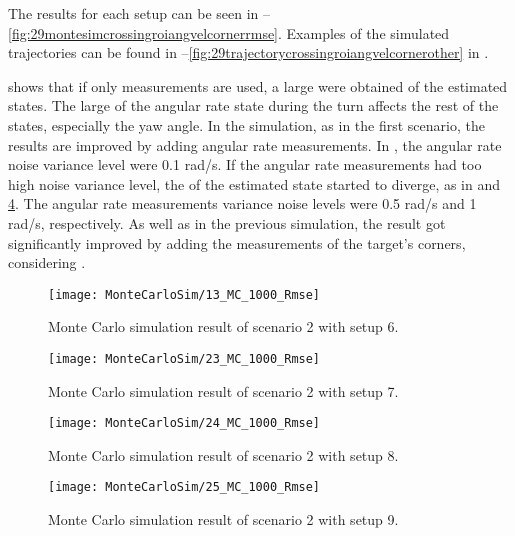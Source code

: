 The results for each setup can be seen in --\ref{fig:29montesimcrossingroiangvelcornerrmse}.
Examples of the simulated trajectories can be found in --\ref{fig:29trajectorycrossingroiangvelcornerother} in .

 shows that if only \abbrROI measurements are used, a large \abbrRMSE were obtained of the estimated states.
The large \abbrRMSE of the angular rate state during the turn affects the rest of the states, especially the yaw angle.
In the simulation, as in the first scenario, the results are improved by adding angular rate measurements.
In , the angular rate noise variance level were 0.1 rad/s.
If the angular rate measurements had too high noise variance level, the \abbrRMSE of the estimated state started to diverge, as in  and \ref{fig:25montesimcrossingroiangvelrmse}.
The angular rate measurements variance noise levels were 0.5 rad/s and 1 rad/s, respectively.
As well as in the previous simulation, the result got significantly improved by adding the measurements of the target's corners, considering .

\begin{figure}[!ht]
	\centering
	\texttt{[image: MonteCarloSim/13\_MC\_1000\_Rmse]}
	\caption{\label{fig:13montesimcrossingroirmse} Monte Carlo simulation result of scenario 2 with setup 6.}
\end{figure}

\begin{figure}[!ht]
	\centering
	\texttt{[image: MonteCarloSim/23\_MC\_1000\_Rmse]}
	\caption{\label{fig:23montesimcrossingroiangvelrmse} Monte Carlo simulation result of scenario 2 with setup 7.}
\end{figure}

\begin{figure}[!ht]
	\centering
	\texttt{[image: MonteCarloSim/24\_MC\_1000\_Rmse]}
	\caption{\label{fig:24montesimcrossingroiangvelrmse} Monte Carlo simulation result of scenario 2 with setup 8.}
\end{figure}

\begin{figure}[!ht]
	\centering
	\texttt{[image: MonteCarloSim/25\_MC\_1000\_Rmse]}
	\caption{\label{fig:25montesimcrossingroiangvelrmse} Monte Carlo simulation result of scenario 2 with setup 9.}
\end{figure}

